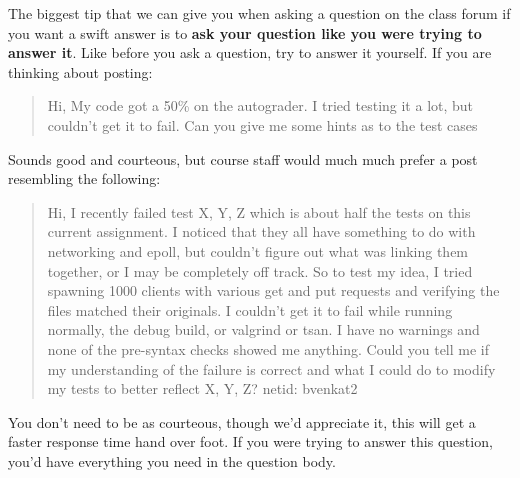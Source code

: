 The biggest tip that we can give you when asking a question on the class forum if you want a swift answer is to \textbf{ask your question like you were trying to answer it}. Like before you ask a question, try to answer it yourself. If you are thinking about posting:

\begin{quote}
Hi, My code got a 50\% on the autograder. I tried testing it a lot, but couldn't get it to fail. Can you give me some hints as to the test cases
\end{quote}

Sounds good and courteous, but course staff would much much prefer a post resembling the following:

\begin{quote}
Hi, I recently failed test X, Y, Z which is about half the tests on this current assignment. I noticed that they all have something to do with networking and epoll, but couldn't figure out what was linking them together, or I may be completely off track. So to test my idea, I tried spawning 1000 clients with various get and put requests and verifying the files matched their originals. I couldn't get it to fail while running normally, the debug build, or valgrind or tsan. I have no warnings and none of the pre-syntax checks showed me anything. Could you tell me if my understanding of the failure is correct and what I could do to modify my tests to better reflect X, Y, Z? netid: bvenkat2
\end{quote}

You don't need to be as courteous, though we'd appreciate it, this will get a faster response time hand over foot. If you were trying to answer this question, you'd have everything you need in the question body.



